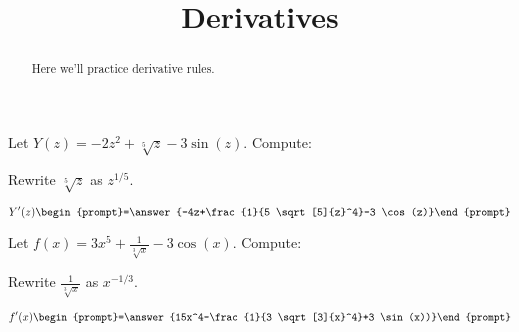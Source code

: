 \documentclass[handout]{ximera}
\title[Exercises:]{Derivatives}
\begin{document}
\begin{abstract}
  Here we'll practice derivative rules.
\end{abstract}
\maketitle

\begin{exercise}
Let $Y(z) = -2 z^2 +\sqrt[5]{z}-3 \sin (z)$. Compute:

\begin{hint}
Rewrite $\sqrt[5]{z}$ as $z^{1/5}$.
\end{hint}

\[
Y'(z)
\begin{prompt}=\answer{-4z+\frac{1}{5 \sqrt[5]{z}^4}-3 \cos (z)}\end{prompt}
\]
\end{exercise}


\begin{exercise}
Let $f(x) = 3x^5+\frac{1}{\sqrt[3]{x}}-3 \cos (x)$. Compute:

\begin{hint}
Rewrite $\frac{1}{\sqrt[3]{x}}$ as $x^{-1/3}$.
\end{hint}
\[
f'(x)
\begin{prompt}=\answer{15x^4-\frac{1}{3 \sqrt[3]{x}^4}+3 \sin(x))}\end{prompt}
\]
\end{exercise}
\end{document}
